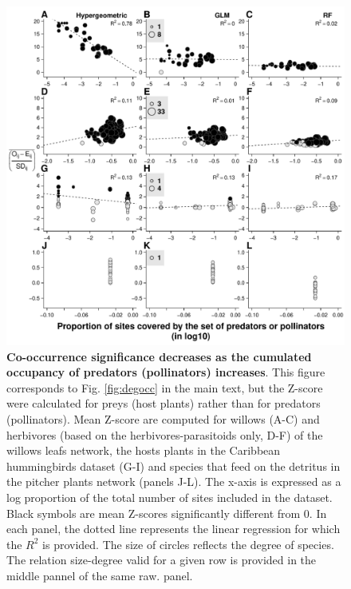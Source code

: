 \begin{figure}[htbp]
\centering
\includegraphics[width=.95\textwidth]{chapitre3/figS8.pdf}
\caption[Co-occurrence significance decreases as the cumulated
occupancy of predators (pollinators) increases]{\textbf{Co-occurrence significance decreases as the cumulated
occupancy of predators (pollinators) increases}. This figure corresponds to
Fig. \ref{fig:degocc} in the
main text, but the Z-score were calculated for preys (host plants)
rather than for predators (pollinators). Mean Z-score are computed for
willows (A-C) and herbivores (based on the herbivores-parasitoids only,
D-F) of the willows leafs network, the hosts plants in the Caribbean
hummingbirds dataset (G-I) and species that feed on the detritus in the
pitcher plants network (panels J-L). The x-axis is expressed as a log
proportion of the total number of sites included in the dataset.
Black symbols are mean Z-scores significantly different from 0.
In each panel, the dotted line represents the linear
regression for which the \(R^2\) is provided. The size of
circles reflects the degree of species. The relation size-degree valid
for a given row is provided in the middle pannel of the same raw.
panel.\label{fig:degocc2}}
\end{figure}

\newpage

